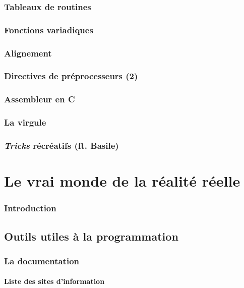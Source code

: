 \documentclass[french]{minitelreport}
\begin{document}
		\section{Tableaux de routines}
		
		\section{Fonctions variadiques}
		
		\section{Alignement}
		
		\section{Directives de préprocesseurs (2)}
		
		\section{Assembleur en C}
		
		\section{La virgule}
		
		\section{\textit{Tricks} récréatifs (ft. Basile)}
		
\part{Le vrai monde de la réalité réelle}
	\section*{Introduction}
	
	\chapter{Outils utiles à la programmation}
		\section{La documentation}
			\subsection{Liste des sites d'information}
\end{document}
